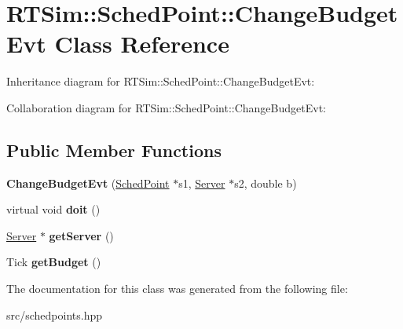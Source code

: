 \hypertarget{classRTSim_1_1SchedPoint_1_1ChangeBudgetEvt}{}\section{R\+T\+Sim\+:\+:Sched\+Point\+:\+:Change\+Budget\+Evt Class Reference}
\label{classRTSim_1_1SchedPoint_1_1ChangeBudgetEvt}


Inheritance diagram for R\+T\+Sim\+:\+:Sched\+Point\+:\+:Change\+Budget\+Evt\+:


Collaboration diagram for R\+T\+Sim\+:\+:Sched\+Point\+:\+:Change\+Budget\+Evt\+:
\subsection*{Public Member Functions}
\begin{DoxyCompactItemize}
\item 
{\bfseries Change\+Budget\+Evt} (\hyperlink{classRTSim_1_1SchedPoint}{Sched\+Point} $\ast$s1, \hyperlink{classRTSim_1_1Server}{Server} $\ast$s2, double b)\hypertarget{classRTSim_1_1SchedPoint_1_1ChangeBudgetEvt_a9556d27f69b23c0503b22ffca9fd689a}{}\label{classRTSim_1_1SchedPoint_1_1ChangeBudgetEvt_a9556d27f69b23c0503b22ffca9fd689a}

\item 
virtual void {\bfseries doit} ()\hypertarget{classRTSim_1_1SchedPoint_1_1ChangeBudgetEvt_ad18fda832901c09e13e6f4d9ddf2bbe5}{}\label{classRTSim_1_1SchedPoint_1_1ChangeBudgetEvt_ad18fda832901c09e13e6f4d9ddf2bbe5}

\item 
\hyperlink{classRTSim_1_1Server}{Server} $\ast$ {\bfseries get\+Server} ()\hypertarget{classRTSim_1_1SchedPoint_1_1ChangeBudgetEvt_a238b40b040c2f263c4a7b7ff7f0cfce1}{}\label{classRTSim_1_1SchedPoint_1_1ChangeBudgetEvt_a238b40b040c2f263c4a7b7ff7f0cfce1}

\item 
Tick {\bfseries get\+Budget} ()\hypertarget{classRTSim_1_1SchedPoint_1_1ChangeBudgetEvt_ad06e6f0c57401305a2666dddf119adbd}{}\label{classRTSim_1_1SchedPoint_1_1ChangeBudgetEvt_ad06e6f0c57401305a2666dddf119adbd}

\end{DoxyCompactItemize}


The documentation for this class was generated from the following file\+:\begin{DoxyCompactItemize}
\item 
src/schedpoints.\+hpp\end{DoxyCompactItemize}

